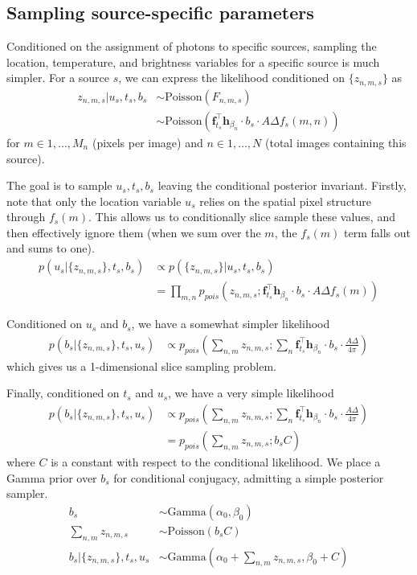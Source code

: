 \documentclass[11pt]{article}
\newcommand{\trans}{\intercal}
\begin{document}
 
\subsection{Sampling source-specific parameters}
Conditioned on the assignment of photons to specific sources, sampling the location, temperature, and brightness variables for a specific source is much simpler.  For a source $s$, we can express the likelihood conditioned on $\{z_{n,m,s}\}$ as 
\begin{align}
  z_{n,m,s} | u_s, t_s, b_s 
    &\sim \textrm{Poisson}(F_{n,m,s}) \\
    &\sim \textrm{Poisson}\left(\mathbf{f}_{t_s}^\trans \mathbf{h}_{\beta_n} \cdot b_s \cdot A \Delta f_s(m,n) \right)
\end{align}
for $m \in 1, \dots, M_n$ (pixels per image) and $n \in 1, \dots, N$ (total images containing this source).  

The goal is to sample $u_s, t_s, b_s$ leaving the conditional posterior invariant.  Firstly, note that only the location variable $u_s$ relies on the spatial pixel structure through $f_s(m)$.  This allows us to conditionally slice sample these values, and then effectively ignore them (when we sum over the $m$, the $f_s(m)$ term falls out and sums to one).  
\begin{align}
  p(u_s | \{ z_{n,m,s} \}, t_s, b_s) &\propto p( \{ z_{n,m,s} \} | u_s, t_s, b_s) \\
  &= \prod_{m,n} p_{pois}\left(z_{n,m,s}; \mathbf{f}_{t_s}^\trans \mathbf{h}_{\beta_n} \cdot b_s \cdot A \Delta f_s(m) \right)
\end{align}

Conditioned on $u_s$ and $b_s$, we have a somewhat simpler likelihood 
\begin{align}
  p(b_s | \{z_{n,m,s}\}, t_s, u_s) 
    &\propto p_{pois}\left( \sum_{n,m} z_{n,m,s};  \sum_{n} \mathbf{f}_{t_s}^\trans \mathbf{h}_{\beta_n} \cdot b_s \cdot \frac{A \Delta}{4 \pi} \right) 
\end{align}
which gives us a 1-dimensional slice sampling problem.  

Finally, conditioned on $t_s$ and $u_s$, we have a very simple likelihood
\begin{align}
  p(b_s | \{z_{n,m,s}\}, t_s, u_s) 
    &\propto p_{pois}\left( \sum_{n,m} z_{n,m,s}; \sum_{n} \mathbf{f}_{t_s}^\trans \mathbf{h}_{\beta_n} \cdot b_s \cdot \frac{A \Delta}{4 \pi} \right) \\
    &= p_{pois}\left( \sum_{n,m} z_{n,m,s};  b_s C \right)
\end{align}
where $C$ is a constant with respect to the conditional likelihood.  We place a Gamma prior over $b_s$ for conditional conjugacy, admitting a simple posterior sampler. 
\begin{align}
  b_s &\sim \textrm{Gamma}(\alpha_0, \beta_0) \\
  \sum_{n,m} z_{n,m,s} &\sim \textrm{Poisson}(b_s C) \\
  b_s | \{z_{n,m,s}\}, t_s, u_s &\sim \textrm{Gamma}\left(\alpha_0 + \sum_{n,m}z_{n,m,s}, \beta_0 + C\right)
\end{align}
\end{document}
